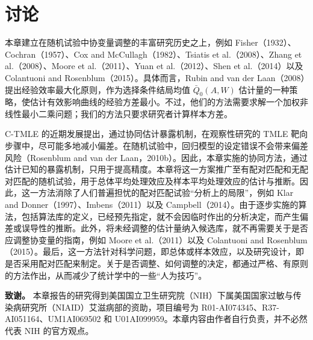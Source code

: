 \section{讨论}
\label{sec:ch13-discussion}

本章建立在随机试验中协变量调整的丰富研究历史之上，例如 Fisher（1932）、Cochran（1957）、Cox and McCullagh（1982）、Tsiatis et al.（2008）、Zhang et al.（2008）、Moore et al.（2011）、Yuan et al.（2012）、Shen et al.（2014）以及 Colantuoni and Rosenblum（2015）。具体而言，Rubin and van der Laan（2008）提出经验效率最大化原则，作为选择条件结局均值 $\bar Q_0(A,W)$ 估计量的一种策略，使估计有效影响曲线的经验方差最小。不过，他们的方法需要求解一个加权非线性最小二乘问题；我们的方法只要求研究者计算样本方差。

C-TMLE 的近期发展提出，通过协同估计暴露机制，在观察性研究的 TMLE 靶向步骤中，尽可能多地减小偏差。在随机试验中，回归模型的设定错误不会带来偏差风险（Rosenblum and van der Laan，2010b）。因此，本章实施的协同方法，通过估计已知的暴露机制，只用于提高精度。本章将这一方案推广至有配对匹配和无配对匹配的随机试验，用于总体平均处理效应及样本平均处理效应的估计与推断。因此，这一方法消除了人们普遍担忧的配对匹配试验“分析上的局限”，例如 Klar and Donner（1997）、Imbens（2011）以及 Campbell（2014）。由于逐步实施的算法，包括算法库的定义，已经预先指定，就不会因临时作出的分析决定，而产生偏差或误导性的推断。此外，将未经调整的估计量纳入候选库，就不再需要关于是否应调整协变量的指南，例如 Moore et al.（2011）以及 Colantuoni and Rosenblum（2015）。最后，这一方法针对科学问题，即总体或样本效应，以及研究设计，即是否采用配对匹配来制定。关于是否调整、如何调整的决定，都通过严格、有原则的方法作出，从而减少了统计学中的一些“人为技巧”。

\noindent\textbf{致谢。}
本章报告的研究得到美国国立卫生研究院（NIH）下属美国国家过敏与传染病研究所（NIAID）艾滋病部的资助，项目编号为 R01-AI074345、R37-AI051164、UM1AI069502 和 U01AI099959。本章内容由作者自行负责，并不必然代表 NIH 的官方观点。


